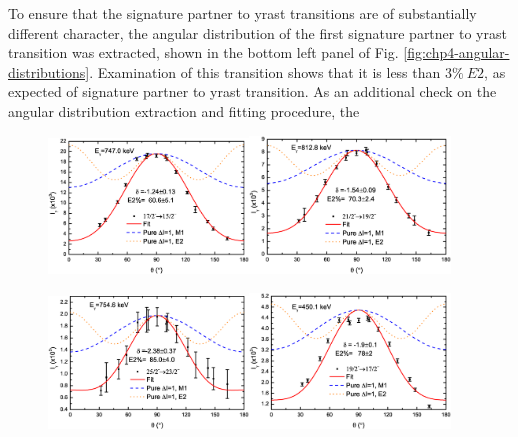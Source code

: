 To ensure that the signature partner to yrast transitions are of substantially different character, the angular distribution of the first signature partner to yrast transition was extracted, shown in the bottom left panel of Fig. \ref{fig:chp4-angular-distributions}. Examination of this transition shows that it is less than $3\%~E2$, as expected of signature partner to yrast transition. As an additional check on the angular distribution extraction and fitting procedure, the
\begin{figure}[t!]
\centerline{\includegraphics[width=0.475\textwidth]{./img/c4/747Dist_Plot.eps}\hspace{0.04\textwidth}\includegraphics[width=0.475\textwidth]{./img/c4/813Dist_Plot.eps}}
\centerline{\includegraphics[width=0.475\textwidth]{./img/c4/755Dist_Plot.eps}\hspace{0.04\textwidth}\includegraphics[width=0.475\textwidth]{./img/c4/450Dist_Plot.eps}}

\end{figure}
